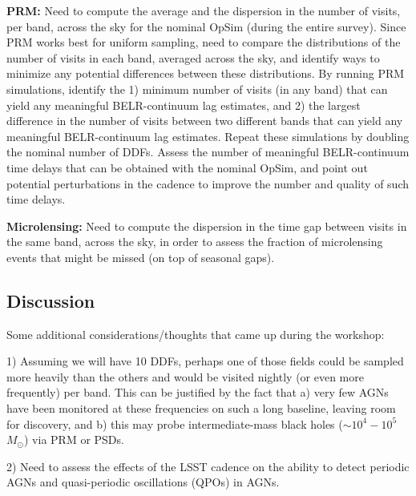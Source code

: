 {\bf PRM:} Need to compute the average and the dispersion in the
number of visits, per band, across the sky for the nominal OpSim
(during the entire survey). Since PRM works best for uniform sampling,
need to compare the distributions of the number of visits in each
band, averaged across the sky, and identify ways to minimize any
potential differences between these distributions. By running PRM
simulations, identify the 1) minimum number of visits (in any band)
that can yield any meaningful BELR-continuum lag estimates, and 2) the
largest difference in the number of visits between two different bands
that can yield any meaningful BELR-continuum lag estimates. Repeat
these simulations by doubling the nominal number of DDFs. Assess the
number of meaningful BELR-continuum time delays that can be obtained
with the nominal OpSim, and point out potential perturbations in the
cadence to improve the number and quality of such time delays.

{\bf Microlensing:} Need to compute the dispersion in the time gap
between visits in the same band, across the sky, in order to assess
the fraction of microlensing events that might be missed (on top of
seasonal gaps).


\subsection{Discussion}
\label{sec:\secname:discussion}


Some additional considerations/thoughts that came up during the workshop:

1) Assuming we will have 10 DDFs, perhaps one of those fields could be
sampled more heavily than the others and would be visited nightly (or
even more frequently) per band. This can be justified by the fact that
a) very few AGNs have been monitored at these frequencies on such a
long baseline, leaving room for discovery, and b) this may probe
intermediate-mass black holes ($\sim10^4 - 10^5$~$M_{\odot}$) via PRM or
PSDs.

2) Need to assess the effects of the LSST cadence on the ability to
detect periodic AGNs and quasi-periodic oscillations (QPOs) in AGNs.

\navigationbar
